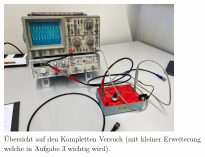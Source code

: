 \begin{figure}[H]
    \centering
    \includegraphics[width=90mm]{bilder/Ab5.jpeg}
    \caption{Übersicht auf den Kompletten Versuch (mit kleiner Erweiterung welche in Aufgabe 3 wichtig wird). \label{Abbildung5}}
\end{figure}